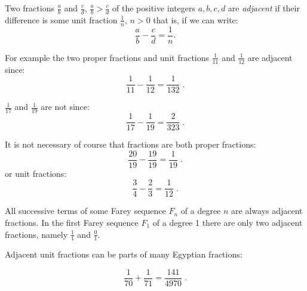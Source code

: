 \documentclass[12pt]{article}
\begin{document}
Two fractions $\frac{a}{b}$ and $\frac{c}{d}$, $\frac{a}{b} > \frac{c}{d}$ of the positive integers $a, b, c, d$ are {\it adjacent} if their difference is some unit fraction $\frac{1}{n}$, $n>0$ that is, if we can write:
\begin{equation*}\frac{a}{b} - \frac{c}{d} = \frac{1}{n}.
\end{equation*}

For example the two proper fractions and unit fractions $\frac{1}{11}$ and $\frac{1}{12}$ are adjacent since: 
\begin{equation*}
\frac{1}{11} - \frac{1}{12} = \frac{1}{132} \; .
\end{equation*}

$\frac{1}{17}$ and $\frac{1}{19}$ are not since: 
$$\frac{1}{17} - \frac{1}{19} = \frac{2}{323} \; . $$

It is not necessary of course that fractions are both proper fractions:
$$\frac{20}{19} - \frac{19}{19} = \frac{1}{19} \; . $$
or unit fractions:
$$\frac{3}{4} - \frac{2}{3} = \frac{1}{12} \; . $$

All successive terms of some Farey sequence $F_{n}$ of a degree $n$ are always adjacent fractions. In the first Farey sequence $F_{1}$ of a degree 1 there are only two adjacent fractions, namely $\frac{1}{1}$ and $\frac{0}{1}$.

Adjacent unit fractions can be parts of many Egyptian fractions:

$$\frac{1}{70} + \frac{1}{71} = \frac{141}{4970} \; . $$
\end{document}
